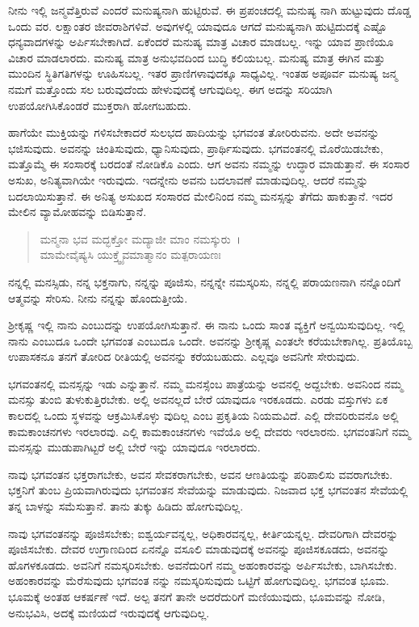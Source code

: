 ನೀನು ಇಲ್ಲಿ ಜನ್ಮವೆತ್ತಿರುವೆ ಎಂದರೆ ಮನುಷ್ಯನಾಗಿ ಹುಟ್ಟಿರುವೆ. ಈ ಪ್ರಪಂಚದಲ್ಲಿ ಮನುಷ್ಯ ನಾಗಿ ಹುಟ್ಟುವುದು ದೊಡ್ಡ ಒಂದು ವರ. ಲಕ್ಷಾಂತರ ಜೀವರಾಶಿಗಳಿವೆ. ಅವುಗಳಲ್ಲಿ ಯಾವುದೂ ಆಗದೆ ಮನುಷ್ಯನಾಗಿ ಹುಟ್ಟಿದುದಕ್ಕೆ ಎಷ್ಟೊ ಧನ್ಯವಾದಗಳನ್ನು ಅರ್ಪಿಸಬೇಕಾಗಿದೆ. ಏಕೆಂದರೆ ಮನುಷ್ಯ ಮಾತ್ರ ವಿಚಾರ ಮಾಡಬಲ್ಲ. ಇನ್ನು ಯಾವ ಪ್ರಾಣಿಯೂ ವಿಚಾರ ಮಾಡಲಾರದು. ಮನುಷ್ಯ ಮಾತ್ರ ಅನುಭವದಿಂದ ಬುದ್ಧಿ ಕಲಿಯಬಲ್ಲ. ಮನುಷ್ಯ ಮಾತ್ರ ಈಗಿನ ಮತ್ತು ಮುಂದಿನ ಸ್ಥಿತಿಗತಿಗಳನ್ನು ಊಹಿಸಬಲ್ಲ. ಇತರ ಪ್ರಾಣಿಗಳಾವುದಕ್ಕೂ ಸಾಧ್ಯವಿಲ್ಲ. ಇಂತಹ ಅಪೂರ್ವ ಮನುಷ್ಯ ಜನ್ಮ ನಮಗೆ ಮತ್ತೊಂದು ಸಲ ಬರುವುದೆಂದು ಹೇಳುವುದಕ್ಕೆ ಆಗುವುದಿಲ್ಲ. ಈಗ ಅದನ್ನು ಸರಿಯಾಗಿ ಉಪಯೋಗಿಸಿಕೊಂಡರೆ ಮುಕ್ತರಾಗಿ ಹೋಗಬಹುದು.

ಹಾಗೆಯೇ ಮುಕ್ತಿಯನ್ನು ಗಳಿಸಬೇಕಾದರೆ ಸುಲಭದ ಹಾದಿಯನ್ನು ಭಗವಂತ ತೋರಿರುವನು. ಅದೇ ಅವನನ್ನು ಭಜಿಸುವುದು. ಅವನನ್ನು ಚಿಂತಿಸುವುದು, ಧ್ಯಾನಿಸುವುದು, ಪ್ರಾರ್ಥಿಸುವುದು. ಭಗವಂತನಲ್ಲಿ ಮೊರೆಯಿಡಬೇಕು, ಮತ್ತೊಮ್ಮೆ ಈ ಸಂಸಾರಕ್ಕೆ ಬರದಂತೆ ನೋಡಿಕೊ ಎಂದು. ಆಗ ಅವನು ನಮ್ಮನ್ನು ಉದ್ಧಾರ ಮಾಡುತ್ತಾನೆ. ಈ ಸಂಸಾರ ಅಸುಖ, ಅನಿತ್ಯವಾಗಿಯೇ ಇರುವುದು. ಇದನ್ನೇನು ಅವನು ಬದಲಾವಣೆ ಮಾಡುವುದಿಲ್ಲ. ಆದರೆ ನಮ್ಮನ್ನು ಬದಲಾಯಿಸುತ್ತಾನೆ. ಈ ಅನಿತ್ಯ ಅಸುಖದ ಸಂಸಾರದ ಮೇಲಿನಿಂದ ನಮ್ಮ ಮನಸ್ಸನ್ನು ತೆಗೆದು ಹಾಕುತ್ತಾನೆ. ಇದರ ಮೇಲಿನ ವ್ಯಾಮೋಹವನ್ನು ಬಿಡಿಸುತ್ತಾನೆ.

\begin{verse}
ಮನ್ಮನಾ ಭವ ಮದ್ಭಕ್ತೋ ಮದ್ಯಾಜೀ ಮಾಂ ನಮಸ್ಕುರು~।\\ಮಾಮೇವೈಷ್ಯಸಿ ಯುಕ್ತ್ವೈವಮಾತ್ಮಾನಂ ಮತ್ಪರಾಯಣಃ 
\end{verse}

{\small ನನ್ನಲ್ಲಿ ಮನಸ್ಸಿಡು, ನನ್ನ ಭಕ್ತನಾಗು, ನನ್ನನ್ನು ಪೂಜಿಸು, ನನ್ನನ್ನೇ ನಮಸ್ಕರಿಸು, ನನ್ನಲ್ಲಿ ಪರಾಯಣನಾಗಿ ನನ್ನೊಂದಿಗೆ ಆತ್ಮವನ್ನು ಸೇರಿಸು. ನೀನು ನನ್ನನ್ನು ಹೊಂದುತ್ತೀಯೆ.}

ಶ‍್ರೀಕೃಷ್ಣ ಇಲ್ಲಿ ನಾನು ಎಂಬುದನ್ನು ಉಪಯೋಗಿಸುತ್ತಾನೆ. ಈ ನಾನು ಒಂದು ಸಾಂತ ವ್ಯಕ್ತಿಗೆ ಅನ್ವಯಿಸುವುದಿಲ್ಲ. ಇಲ್ಲಿ ನಾನು ಎಂಬುದೂ ಒಂದೇ ಭಗವಂತ ಎಂಬುದೂ ಒಂದೇ. ಅವನನ್ನು ಶ‍್ರೀಕೃಷ್ಣ ಎಂತಲೇ ಕರೆಯಬೇಕಾಗಿಲ್ಲ. ಪ್ರತಿಯೊಬ್ಬ ಉಪಾಸಕನೂ ತನಗೆ ತೋರಿದ ರೀತಿಯಲ್ಲಿ ಅವನನ್ನು ಕರೆಯಬಹುದು. ಎಲ್ಲವೂ ಅವನಿಗೇ ಸೇರುವುದು.

ಭಗವಂತನಲ್ಲಿ ಮನಸ್ಸನ್ನು ಇಡು ಎನ್ನುತ್ತಾನೆ. ನಮ್ಮ ಮನಸ್ಸೆಂಬ ಪಾತ್ರೆಯನ್ನು ಅವನಲ್ಲಿ ಅದ್ದಬೇಕು. ಅವನಿಂದ ನಮ್ಮ ಮನಸ್ಸು ತುಂಬಿ ತುಳುಕುತ್ತಿರಬೇಕು. ಅಲ್ಲಿ ಅವನಲ್ಲದೆ ಬೇರೆ ಯಾವುದೂ ಇರಕೂಡದು. ಎರಡು ವಸ್ತುಗಳು ಏಕ ಕಾಲದಲ್ಲಿ ಒಂದು ಸ್ಥಳವನ್ನು ಆಕ್ರಮಿಸಿಕೊಳ್ಳು ವುದಿಲ್ಲ ಎಂಬ ಪ್ರಕೃತಿಯ ನಿಯಮವಿದೆ. ಎಲ್ಲಿ ದೇವರಿರುವನೊ ಅಲ್ಲಿ ಕಾಮಕಾಂಚನಗಳು ಇರಲಾರವು. ಎಲ್ಲಿ ಕಾಮಕಾಂಚನಗಳು ಇವೆಯೊ ಅಲ್ಲಿ ದೇವರು ಇರಲಾರನು. ಭಗವಂತನಿಗೆ ನಮ್ಮ ಮನಸ್ಸನ್ನು ಮುಡುಪಾಗಿಟ್ಟರೆ ಅಲ್ಲಿ ಬೇರೆ ಇನ್ನು ಯಾವುದೂ ಇರಲಾರದು.

ನಾವು ಭಗವಂತನ ಭಕ್ತರಾಗಬೇಕು, ಅವನ ಸೇವಕರಾಗಬೇಕು, ಅವನ ಆಣತಿಯನ್ನು ಪರಿಪಾಲಿಸು ವವರಾಗಬೇಕು. ಭಕ್ತನಿಗೆ ತುಂಬ ಪ್ರಿಯವಾಗಿರುವುದು ಭಗವಂತನ ಸೇವೆಯನ್ನು ಮಾಡುವುದು. ನಿಜವಾದ ಭಕ್ತ ಭಗವಂತನ ಸೇವೆಯಲ್ಲಿ ತನ್ನ ಬಾಳನ್ನು ಸಮೆಸುತ್ತಾನೆ. ತಾನು ತುಕ್ಕು ಹಿಡಿದು ಹೋಗುವುದಿಲ್ಲ.

ನಾವು ಭಗವಂತನನ್ನು ಪೂಜಿಸಬೇಕು; ಐಶ್ವರ್ಯವನ್ನಲ್ಲ, ಅಧಿಕಾರವನ್ನಲ್ಲ, ಕೀರ್ತಿಯನ್ನಲ್ಲ. ದೇವರಿಗಾಗಿ ದೇವರನ್ನು ಪೂಜಿಸಬೇಕು. ದೇವರ ಉಗ್ರಾಣದಿಂದ ಏನನ್ನೊ ವಸೂಲಿ ಮಾಡುವುದಕ್ಕೆ ಅವನನ್ನು ಪೂಜಿಸಕೂಡದು, ಅವನನ್ನು ಹೊಗಳಕೂಡದು. ಅವನಿಗೆ ನಮಸ್ಕರಿಸಬೇಕು. ಅವನೆದುರಿಗೆ ನಮ್ಮ ಅಹಂಕಾರವನ್ನು ಅರ್ಪಿಸಬೇಕು, ಬಾಗಿಸಬೇಕು. ಅಹಂಕಾರವನ್ನು ಮೆರೆಸುವುದು ಭಗವಂತ ನನ್ನು ನಮಸ್ಕರಿಸುವುದು ಒಟ್ಟಿಗೆ ಹೋಗುವುದಿಲ್ಲ. ಭಗವಂತ ಭೂಮ. ಭೂಮಕ್ಕೆ ಅಂತಹ ಆಕರ್ಷಣೆ ಇದೆ. ಅಲ್ಪ ತನಗೆ ತಾನೇ ಅದರೆದುರಿಗೆ ಮಣಿಯುವುದು, ಭೂಮವನ್ನು ನೋಡಿ, ಅನುಭವಿಸಿ, ಅದಕ್ಕೆ ಮಣಿಯದೆ ಇರುವುದಕ್ಕೆ ಆಗುವುದಿಲ್ಲ.

